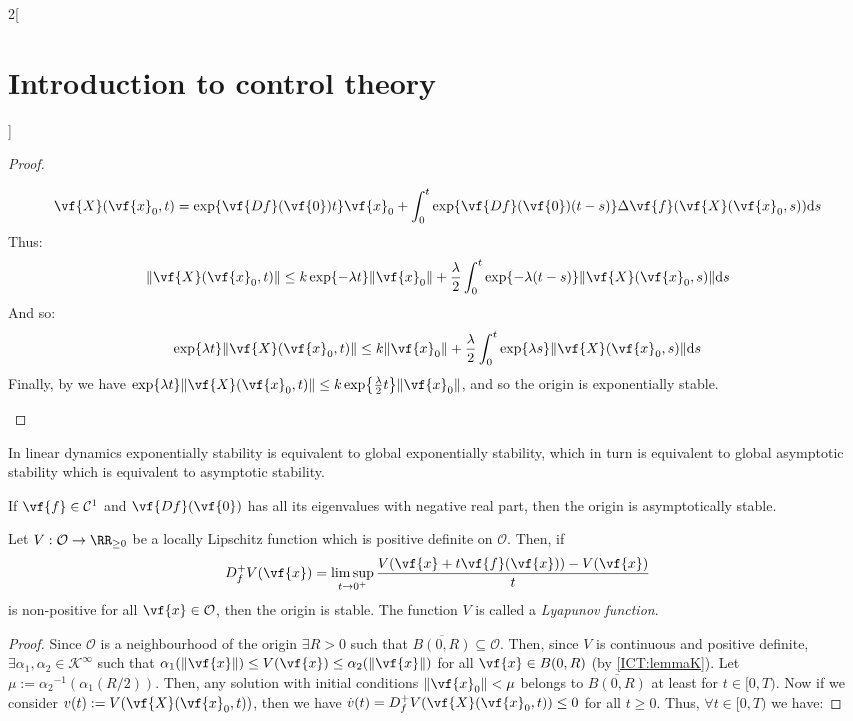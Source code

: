 \documentclass[../../../main_math.tex]{subfiles}
\begin{document}
\begin{multicols}{2}[\section{Introduction to control theory}]
\begin{proof}
\begin{enumerate}
            $$
              \vf{X}(\vf{x}_0,t)=\exp{\vf{Df}(\vf{0})t}\vf{x}_0+\int_0^t\exp{\vf{Df}(\vf{0})(t-s)}\Delta\vf{f}(\vf{X}(\vf{x}_0,s))\dd s
            $$
            Thus:
            $$
              \norm{\vf{X}(\vf{x}_0,t)}\leq k \exp{-\lambda t}\norm{\vf{x}_0}+\frac{\lambda}{2}\int_0^t\exp{-\lambda(t-s)}\norm{\vf{X}(\vf{x}_0,s)}\dd s
            $$
            And so:
            $$
              \exp{\lambda t}\norm{\vf{X}(\vf{x}_0,t)}\leq k \norm{\vf{x}_0}+\frac{\lambda}{2}\int_0^t\exp{\lambda s}\norm{\vf{X}(\vf{x}_0,s)}\dd s
            $$
            Finally, by  we have $\exp{\lambda t}\norm{\vf{X}(\vf{x}_0,t)}\leq k \exp{\frac{\lambda}{2} t}\norm{\vf{x}_0}$, and so the origin is exponentially stable.
    \end{enumerate}
  \end{proof}
  \begin{remark}
    In linear dynamics exponentially stability is equivalent to global exponentially stability, which in turn is equivalent to global asymptotic stability which is equivalent to asymptotic stability.
  \end{remark}
  \begin{corollary}
    If $\vf{f}\in\mathcal{C}^1$ and $\vf{Df}(\vf{0})$ has all its eigenvalues with negative real part, then the origin is asymptotically stable.
  \end{corollary}
  \begin{theorem}
    Let $V:\mathcal{O}\to \RR_{\geq 0}$ be a locally Lipschitz function which is positive definite on $\mathcal{O}$. Then, if
    $$
      D_f^+V(\vf{x}) = \limsup_{t\to 0^+}\frac{V(\vf{x} + t\vf{f}(\vf{x})) - V(\vf{x})}{t}
    $$
    is non-positive for all $\vf{x}\in \mathcal{O}$, then the origin is stable. The function $V$ is called a \emph{Lyapunov function}.
  \end{theorem}
  \begin{proof}
    Since $\mathcal{O}$ is a neighbourhood of the origin $\exists R>0$ such that $\overline{B(0,R)}\subseteq \mathcal{O}$. Then, since $V$ is continuous and positive definite, $\exists \alpha_1,\alpha_2\in\mathcal{K}^\infty$ such that $\alpha_1(\norm{\vf{x}})\leq V(\vf{x})\leq \alpha_2(\norm{\vf{x}})$ for all $\vf{x}\in B(0,R)$ (by \cref{ICT:lemmaK}). Let $\mu:={\alpha_2}^{-1}(\alpha_1(R/2))$. Then, any solution with initial conditions $\norm{\vf{x}_0}<\mu$ belongs to $\overline{B(0,R)}$ at least for $t\in[0, T)$. Now if we consider $v(t) := V(\vf{X}(\vf{x}_0, t))$, then we have $\dot{v}(t) = D_f^+V(\vf{X}(\vf{x}_0, t))\leq 0$ for all $t\geq 0$. Thus, $\forall t \in [0, T)$ we have:

\end{proof}
\end{multicols}
\end{document}
